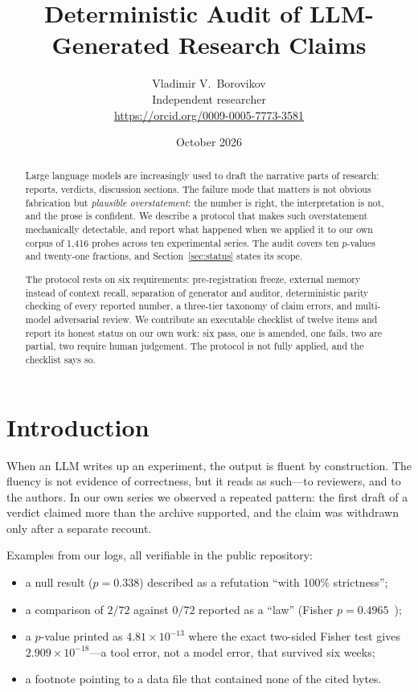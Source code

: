 \documentclass[11pt]{article}
\title{Deterministic Audit of LLM-Generated Research Claims}
\author{Vladimir V.~Borovikov\\
\small Independent researcher\\
\small \url{https://orcid.org/0009-0005-7773-3581}}
\date{October 2026}
\begin{document}
\maketitle

\begin{abstract}
Large language models are increasingly used to draft the narrative parts of
research: reports, verdicts, discussion sections. The failure mode that matters
is not obvious fabrication but \emph{plausible overstatement}: the number is
right, the interpretation is not, and the prose is confident. We describe a
protocol that makes such overstatement mechanically detectable, and report what
happened when we applied it to our own corpus of 1{,}416 probes across ten
experimental series. The audit covers ten $p$-values and twenty-one fractions,
and Section~\ref{sec:status} states its scope.

The protocol rests on six requirements: pre-registration freeze, external memory
instead of context recall, separation of generator and auditor, deterministic
parity checking of every reported number, a three-tier taxonomy of claim errors,
and multi-model adversarial review. We contribute an executable checklist of
twelve items and report its honest status on our own work: six pass, one is
amended, one fails, two are partial, two require human judgement. The protocol
is not fully applied, and the checklist says so.
\end{abstract}

\section{Introduction}

When an LLM writes up an experiment, the output is fluent by construction. The
fluency is not evidence of correctness, but it reads as such---to reviewers, and
to the authors. In our own series we observed a repeated pattern: the first
draft of a verdict claimed more than the archive supported, and the claim was
withdrawn only after a separate recount.

Examples from our logs, all verifiable in the public repository:

\begin{itemize}
  \item a null result ($p = 0.338$) described as a refutation ``with 100\%
        strictness'';
  \item a comparison of $2/72$ against $0/72$ reported as a ``law''
        (Fisher $p = 0.4965$~\cite{fisher1935});
  \item a $p$-value printed as $4.81\times10^{-13}$ where the exact two-sided
        Fisher test gives $2.909\times10^{-18}$---a tool error, not a model
        error, that survived six weeks;
  \item a footnote pointing to a data file that contained none of the cited
        bytes.
\end{itemize}
\end{document}
